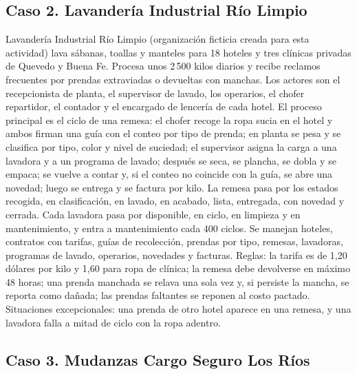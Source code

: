 \documentclass[11pt]{article}
\newcommand{\subseccion}[1]{\subsection{\textcolor{midblue}{#1}}}
\begin{document}
\subseccion{Caso 2. Lavandería Industrial Río Limpio}

Lavandería Industrial Río Limpio (organización ficticia creada para esta actividad) lava sábanas, toallas y manteles para 18 hoteles y tres clínicas privadas de Quevedo y Buena Fe. Procesa unos 2\,500 kilos diarios y recibe reclamos frecuentes por prendas extraviadas o devueltas con manchas. Los actores son el recepcionista de planta, el supervisor de lavado, los operarios, el chofer repartidor, el contador y el encargado de lencería de cada hotel. El proceso principal es el ciclo de una remesa: el chofer recoge la ropa sucia en el hotel y ambos firman una guía con el conteo por tipo de prenda; en planta se pesa y se clasifica por tipo, color y nivel de suciedad; el supervisor asigna la carga a una lavadora y a un programa de lavado; después se seca, se plancha, se dobla y se empaca; se vuelve a contar y, si el conteo no coincide con la guía, se abre una novedad; luego se entrega y se factura por kilo. La remesa pasa por los estados recogida, en clasificación, en lavado, en acabado, lista, entregada, con novedad y cerrada. Cada lavadora pasa por disponible, en ciclo, en limpieza y en mantenimiento, y entra a mantenimiento cada 400 ciclos. Se manejan hoteles, contratos con tarifas, guías de recolección, prendas por tipo, remesas, lavadoras, programas de lavado, operarios, novedades y facturas. Reglas: la tarifa es de 1,20 dólares por kilo y 1,60 para ropa de clínica; la remesa debe devolverse en máximo 48 horas; una prenda manchada se relava una sola vez y, si persiste la mancha, se reporta como dañada; las prendas faltantes se reponen al costo pactado. Situaciones excepcionales: una prenda de otro hotel aparece en una remesa, y una lavadora falla a mitad de ciclo con la ropa adentro.

\subseccion{Caso 3. Mudanzas Cargo Seguro Los Ríos}
\end{document}
